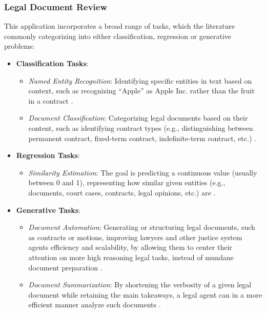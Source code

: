 \documentclass[11pt,a4paper,twoside,openright]{book}
\begin{document}
\subsubsection{Legal Document Review}
This application incorporates a broad range of tasks, which the literature commonly categorizing into either classification, regression or generative problems:
\begin{itemize}
    \item \textbf{Classification Tasks}: 
    \begin{itemize}
        \item \textit{Named Entity Recognition}: Identifying specific entities in text based on context, such as recognizing ``Apple'' as Apple Inc. rather than the fruit in a contract \parencite{siino_Lit_review_LLMs_2025, shao_llms_meet_law_2025}.
        \item \textit{Document Classification}: Categorizing legal documents based on their content, such as identifying contract types (e.g., distinguishing between permanent contract, fixed-term contract, indefinite-term contract, etc.) \parencite{siino_Lit_review_LLMs_2025, shao_llms_meet_law_2025}.

    \end{itemize}

    \item \textbf{Regression Tasks}:
    \begin{itemize}
        \item \textit{Similarity Estimation}:
        The goal is predicting a continuous value (usually between 0 and 1), representing how similar given entities (e.g., documents, court cases, contracts, legal opinions, etc.) are \parencite{siino_Lit_review_LLMs_2025,zhong_summary_LegalAI_2020}.
    \end{itemize}


    \item  \textbf{Generative Tasks}:
    \begin{itemize}

        \item \textit{Document Automation}: Generating or structuring legal documents, such as contracts or motions, improving lawyers and other justice system agents efficiency and scalability, by allowing them to center their attention on more high reasoning legal tasks, instead of mundane document preparation \parencite{siino_Lit_review_LLMs_2025, shao_llms_meet_law_2025}.

        \item \textit{Document Summarization}:
        By shortening the verbosity of a given legal document while retaining the main takeaways, a legal agent can in a more efficient manner analyze such documents \parencite{siino_Lit_review_LLMs_2025, shao_llms_meet_law_2025}.
    \end{itemize}
\end{itemize}
\end{document}
